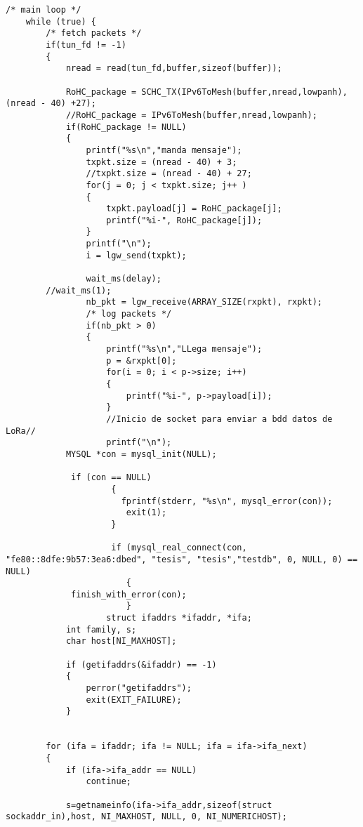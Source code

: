 \begin{lstlisting}[frame=single,caption=Extracto de código del módulo de transición LoRa/IPv6	]  % Start your code-block
/* main loop */
    while (true) {
        /* fetch packets */
        if(tun_fd != -1)
        {
            nread = read(tun_fd,buffer,sizeof(buffer));
            
            RoHC_package = SCHC_TX(IPv6ToMesh(buffer,nread,lowpanh),(nread - 40) +27);
            //RoHC_package = IPv6ToMesh(buffer,nread,lowpanh);
            if(RoHC_package != NULL)
            {
                printf("%s\n","manda mensaje");
                txpkt.size = (nread - 40) + 3;
                //txpkt.size = (nread - 40) + 27;
                for(j = 0; j < txpkt.size; j++ )
                {
                    txpkt.payload[j] = RoHC_package[j];
                    printf("%i-", RoHC_package[j]);
                }
                printf("\n");
                i = lgw_send(txpkt);

                wait_ms(delay);
        //wait_ms(1);
                nb_pkt = lgw_receive(ARRAY_SIZE(rxpkt), rxpkt);
                /* log packets */
                if(nb_pkt > 0)
                {
                    printf("%s\n","LLega mensaje");
                    p = &rxpkt[0];
                    for(i = 0; i < p->size; i++)
                    {
                        printf("%i-", p->payload[i]);
                    }
                    //Inicio de socket para enviar a bdd datos de LoRa//
                    printf("\n");
		    MYSQL *con = mysql_init(NULL);

		     if (con == NULL) 
                     {
                       fprintf(stderr, "%s\n", mysql_error(con));
                        exit(1);
                     }

                     if (mysql_real_connect(con, "fe80::8dfe:9b57:3ea6:dbed", "tesis", "tesis","testdb", 0, NULL, 0) == NULL) 
                        {
			 finish_with_error(con);
                        } 
                    struct ifaddrs *ifaddr, *ifa;
		    int family, s;
		    char host[NI_MAXHOST];

		    if (getifaddrs(&ifaddr) == -1) 
		    {
		        perror("getifaddrs");
		        exit(EXIT_FAILURE);
		    }


	    for (ifa = ifaddr; ifa != NULL; ifa = ifa->ifa_next) 
	    {
	        if (ifa->ifa_addr == NULL)
	            continue;  

        	s=getnameinfo(ifa->ifa_addr,sizeof(struct sockaddr_in),host, NI_MAXHOST, NULL, 0, NI_NUMERICHOST);


\end{lstlisting}
